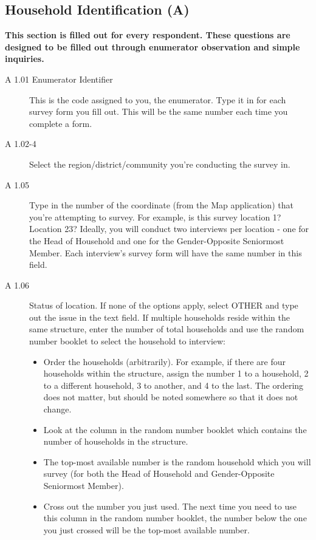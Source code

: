\documentclass[a4paper]{refart}
\begin{document}
\subsection{Household Identification (A)}
\textbf{This section is filled out for every respondent. These questions are designed to be filled out through enumerator observation and simple inquiries.}


\begin{description}
\item[A 1.01 Enumerator Identifier] This is the code assigned to you, the enumerator. Type it in for each survey form you fill out. This will be the same number each time you complete a form.

\item[A 1.02-4] Select the region/district/community you're conducting the survey in.

\item[A 1.05] Type in the number of the coordinate (from the Map application) that you're attempting to survey. For example, is this survey location 1? Location 23? Ideally, you will conduct two interviews per location - one for the Head of Household and one for the Gender-Opposite Seniormost Member. Each interview's survey form will have the same number in this field.

\item[A 1.06] Status of location. If none of the options apply, select OTHER and type out the issue in the text field. If multiple households reside within the same structure, enter the number of total households and use the random number booklet to select the household to interview:
\begin{itemize}
\item Order the households (arbitrarily). For example, if there are four households within the structure, assign the number 1 to a household, 2 to a different household, 3 to another, and 4 to the last. The ordering does not matter, but should be noted somewhere so that it does not change.
\item Look at the column in the random number booklet which contains the number of households in the structure.
\item The top-most available number is the random household which you will survey (for both the Head of Household and Gender-Opposite Seniormost Member).
\item Cross out the number you just used. The next time you need to use this column in the random number booklet, the number below the one you just crossed will be the top-most available number.
\end{itemize}


\end{description}
\end{document}

